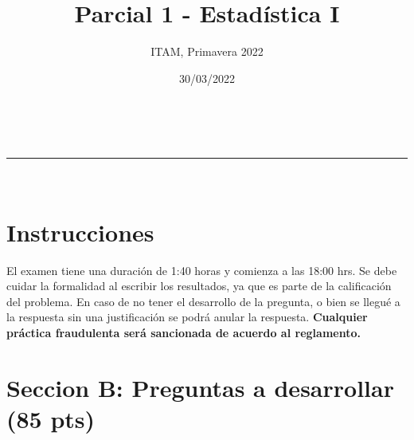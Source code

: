 \documentclass[addpoints]{exam}
\makeatletter
\newcommand{\linia}{\rule{\linewidth}{0.5pt}}
\theoremstyle{mytheor}
\renewcommand{\maketitle}{
    \begin{center}
    \vspace{2ex}
    {\huge \textsc{\@title}}
    \vspace{1ex}
    \\
    \linia\\
    \@author \hfill \@date
    \vspace{4ex}
    \end{center}
  }
\makeatother
\begin{document}
  
  \title{Parcial 1 - Estadística I}
  
  \author{ITAM, Primavera 2022}
  
  \date{30/03/2022}
  
  \maketitle
  
  \section*{Instrucciones}
  
El examen tiene una duración de 1:40 horas y comienza a las 18:00 hrs. Se debe cuidar la formalidad al escribir los resultados, ya que es parte de la calificación del problema. En caso de no tener el desarrollo de la pregunta, o bien se llegué a la respuesta sin una justificación se podrá anular la respuesta. \textbf{Cualquier práctica fraudulenta será sancionada de acuerdo al reglamento.} 

\vspace{10pt}
  
  \section*{Seccion B: Preguntas a desarrollar (85 pts)}
  
\end{document}
